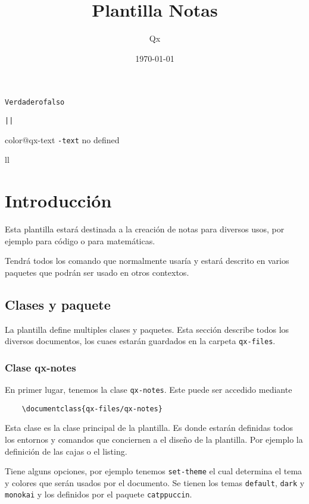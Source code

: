 \documentclass{qx-files/qx-notes}
\title{Plantilla Notas}
\author{Qx}
\date{\today}
\begin{document}
  \maketitle


  \makeatletter
  \texttt{\ifqx@pagecolor Verdadero\else falso\fi}

  \texttt{|\meaning\qx@themeName|}

  \expandafter\ifdefined\csname color@qx-text\endcsname
    \texttt{\expandafter\meaning\csname \string{}-text\endcsname}%
  \else no defined\fi

  ll

  \makeatother


  \chapter{Introducción}

  Esta plantilla estará destinada a la creación de notas para diversos usos, por ejemplo para código o para matemáticas.

  Tendrá todos los comando que normalmente usaría y estará descrito en varios paquetes que podrán ser usado en otros contextos.

  \section{Clases y paquete}

  La plantilla define multiples clases y paquetes. Esta sección describe todos los diversos documentos, los cuaes estarán guardados en la carpeta \verb|qx-files|.

  \subsection{Clase qx-notes}

  En primer lugar, tenemos la clase \verb|qx-notes|. Este puede ser accedido mediante
  \begin{verbatim}
    \documentclass{qx-files/qx-notes}
  \end{verbatim}

  Esta clase es la clase principal de la plantilla. Es donde estarán definidas todos los entornos y comandos que conciernen a el diseño de la plantilla. Por ejemplo la definición de las cajas o el listing.

  Tiene alguns opciones, por ejemplo tenemos \verb|set-theme| el cual determina el tema y colores que serán usados por el documento. Se tienen los temas \verb|default|, \verb|dark| y \verb|monokai| y los definidos por el paquete \verb|catppuccin|.
\end{document}
